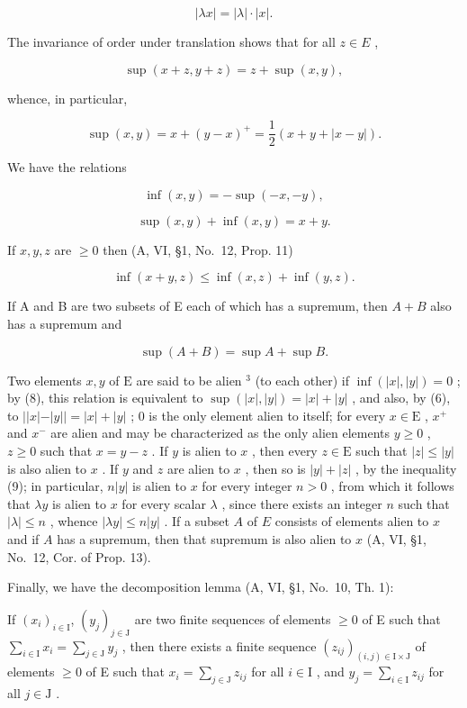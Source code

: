 \[
\left| \lambda x \right| = \left| \lambda \right| \cdot \left| x \right|.\tag{4}
\]

The invariance of order under translation shows that for all \(z \in E\) ,

\[
\sup (x + z, y + z) = z + \sup (x, y),\tag{5}
\]

whence, in particular,

\[
\sup (x, y) = x + (y - x) ^ {+} = \frac {1}{2} (x + y + | x - y |).\tag{6}
\]

We have the relations

\[
\inf (x, y) = - \sup (- x, - y),\tag{7}
\]

\[
\sup (x, y) + \inf (x, y) = x + y.\tag{8}
\]

If \(x, y, z\) are \(\geqslant 0\) then (A, VI, §1, No.~12, Prop. 11)

\[
\inf (x + y, z) \leqslant \inf (x, z) + \inf (y, z).\tag{9}
\]

If A and B are two subsets of E each of which has a supremum, then \(A + B\) also has a supremum and

\[
\sup (A + B) = \sup A + \sup B.\tag{10}
\]

Two elements \(x, y\) of \(\mathrm{E}\) are said to be alien \(^3\) (to each other) if \(\inf(|x|, |y|) = 0\) ; by (8), this relation is equivalent to \(\sup(|x|, |y|) = |x| + |y|\) , and also, by (6), to \(||x| - |y|| = |x| + |y|\) ; 0 is the only element alien to itself; for every \(x \in \mathrm{E}\) , \(x^+\) and \(x^-\) are alien and may be characterized as the only alien elements \(y \geqslant 0\) , \(z \geqslant 0\) such that \(x = y - z\) . If \(y\) is alien to \(x\) , then every \(z \in \mathrm{E}\) such that \(|z| \leqslant |y|\) is also alien to \(x\) . If \(y\) and \(z\) are alien to \(x\) , then so is \(|y| + |z|\) , by the inequality (9); in particular, \(n|y|\) is alien to \(x\) for every integer \(n > 0\) , from which it follows that \(\lambda y\) is alien to \(x\) for every scalar \(\lambda\) , since there exists an integer \(n\) such that \(|\lambda| \leqslant n\) , whence \(|\lambda y| \leqslant n|y|\) . If a subset \(A\) of \(E\) consists of elements alien to \(x\) and if \(A\) has a supremum, then that supremum is also alien to \(x\) (A, VI, §1, No.~12, Cor. of Prop. 13).

Finally, we have the decomposition lemma (A, VI, §1, No.~10, Th. 1):

If \((x_{i})_{i\in \mathrm{I}}\), \((y_{j})_{j\in \mathrm{J}}\) are two finite sequences of elements \(\geqslant 0\) of E such that \(\sum_{i\in \mathrm{I}}x_i = \sum_{j\in \mathrm{J}}y_j\) , then there exists a finite sequence \((z_{ij})_{(i,j)\in \mathrm{I}\times \mathrm{J}}\) of elements \(\geqslant 0\) of E such that \(x_{i} = \sum_{j\in \mathrm{J}}z_{ij}\) for all \(i\in \mathrm{I}\) , and \(y_{j} = \sum_{i\in \mathrm{I}}z_{ij}\) for all \(j\in \mathrm{J}\) .

